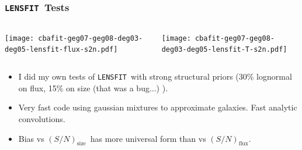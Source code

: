 \documentclass{beamer}
\newcommand{\snT}{$(S/N)_{\textrm{size}}$}
\newcommand{\snflux}{$(S/N)_{\textrm{flux}}$}
\newcommand{\lensfit}{\texttt{LENSFIT}}
\begin{document}
\frame
{
    \frametitle{\lensfit\ Tests}

    \begin{columns}
        
        \begin{column}{0.5\textwidth}
            \texttt{[image: cbafit-geg07-geg08-deg03-deg05-lensfit-flux-s2n.pdf]}
        \end{column}

        \begin{column}{0.5\textwidth}
            \texttt{[image: cbafit-geg07-geg08-deg03-deg05-lensfit-T-s2n.pdf]}
        \end{column}
    \end{columns}

    \fontsize{9}{0.8\baselineskip}
    \begin{itemize}

        \item I did my own tests of \lensfit\ with strong structural priors
            (30\% lognormal on flux, 15\% on size (that was a bug...) ).

        \item Very fast code using gaussian mixtures to approximate galaxies.  Fast
            analytic convolutions.

        \item Bias vs \snT\ has more universal form than vs \snflux.
    \end{itemize}

}

\end{document}
